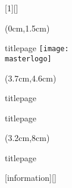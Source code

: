 [1][]
{
\begin{textblock*}{5cm}(0cm,1.5cm)
    \begin{beamercolorbox}[sep=2pt, wd=5cm, ht=10pt, left, ignorebg, #1]{titlepage}
    \texttt{[image: \\masterlogo]}
    \end{beamercolorbox}
\end{textblock*}

\begin{textblock*}{7.3cm}(3.7cm,4.6cm)
    \begin{flushleft}
    
    \begin{beamercolorbox}[wd=7.3cm, ht=5pt, left, ignorebg, #1]{titlepage}
    \huge{\textbf{\inserttitle}}
    \end{beamercolorbox}
    \vspace{.5cm}
    \hspace{-5pt}
    
    \begin{beamercolorbox}[sep=0pt, wd=7.3cm, ht=5pt, left, ignorebg, #1]{titlepage}
    \insertauthor
    \end{beamercolorbox}
    
    \end{flushleft}
\end{textblock*}

\begin{textblock*}{7.8cm}(3.2cm,8cm)
    \begin{beamercolorbox}[sep=2pt, wd=2cm, ht=10pt, left, ignorebg, #1]{titlepage}
    
    \end{beamercolorbox}
\end{textblock*}

}

\newcommand{\inserttitlepage}[0]{\frame[plain]{\titlepage}}
[information][]